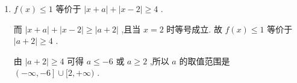 \begin{enumerate}
\begin{jieda}
\begin{enumerate}
            可得 $f\left( x\right)  \geq  0$ 的解集为 $\{ x \mid   - 2 \leq  x \leq  3\}$ .
            \item $f\left( x\right)  \leq  1$ 等价于 $\left| {x + a}\right|  + \left| {x - 2}\right|  \geq  4$ .
            
            而 $\left| {x + a}\right|  + \left| {x - 2}\right|  \geq  \left| {a + 2}\right|$ ,且当 $x = 2$ 时等号成立. 故 $f\left( x\right)  \leq  1$ 等价于 $\left| {a + 2}\right|  \geq  4$ .
            
            由 $\left| {a + 2}\right|  \geq  4$ 可得 $a \leq   - 6$ 或 $a \geq  2$ ,所以 $a$ 的取值范围是 $\left( {-\infty , - 6}\right\rbrack   \cup  \lbrack 2, + \infty )$ .
        \end{enumerate}
    \end{jieda}
\end{enumerate}
